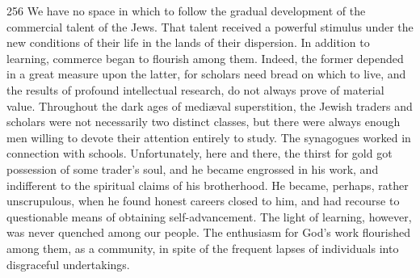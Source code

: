 \begin{tp}{256}
We have no space in which to follow the
gradual development of the commercial talent
of the Jews. That talent received a powerful
stimulus under the new conditions of their
life in the lands of their dispersion. In
addition to learning, commerce began to
flourish among them. Indeed, the former
depended in a great measure upon the
latter, for scholars need bread on which
to live, and the results of profound intellectual
research, do not always prove of
material value. Throughout the dark ages
of mediæval superstition, the Jewish traders
and scholars were not necessarily two
distinct classes, but there were always
enough men willing to devote their attention
entirely to study. The synagogues
worked in connection with schools.
Unfortunately, here and there, the thirst for
gold got possession of some trader’s soul,
and he became engrossed in his work, and
indifferent to the spiritual claims of his
brotherhood. He became, perhaps, rather
unscrupulous, when he found honest careers
closed to him, and had recourse to questionable
means of obtaining self-advance\-ment.
The light of learning, however, was never
quenched among our people. The
enthusiasm for God’s work flourished among
them, as a community, in spite of the
frequent lapses of individuals into disgraceful
undertakings.
\end{tp}

